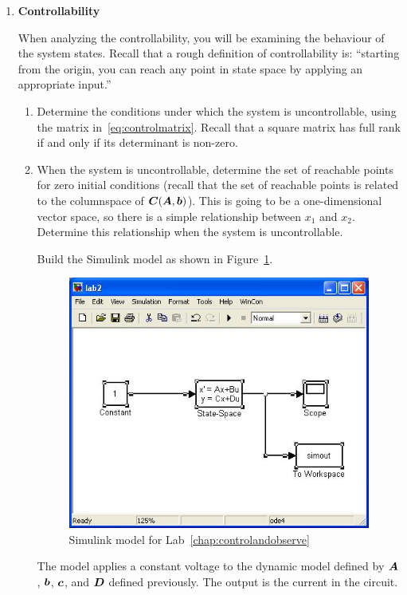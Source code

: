 \begin{enumerate}
    \item \textbf{Controllability}\label{step:1}

          When analyzing the controllability, you will be examining the behaviour of
          the system states.  Recall that a rough definition of controllability is:
          ``starting from the origin, you can reach any point in state space by
          applying an appropriate input.''
          \begin{enumerate}
              \item Determine the conditions under which the system is uncontrollable, using the matrix in~\eqref{eq:controlmatrix}.
                    Recall that a square matrix has full rank if and only if its determinant is
                    non-zero.
              \item When the system is uncontrollable, determine the set of reachable
                    points for zero initial conditions (recall that the set of reachable points is related to the columnspace of \( \boldsymbol{C}(\boldsymbol{A},\boldsymbol{b}) \)). This is going to be a one-dimensional
                    vector space, so there is a simple relationship between \(x_{1}\) and \(x_{2}\).
                    Determine this relationship when the system is uncontrollable.

                    \vspace{0.5em}
                    Build the \textsf{Simulink} model as shown in
                    Figure~\ref{fig:model2}.
                    \begin{figure}[htbp]
                        \centering
                        \includegraphics[width=0.6\hsize]{pix/controlandobservemodel.jpg}
                        \caption{\textsf{Simulink} model for Lab~\ref{chap:controlandobserve}}\label{fig:model2}
                    \end{figure}%
                    The model applies a constant voltage to the dynamic model defined by
                    \(\boldsymbol{A}\), \(\boldsymbol{b}\), \(\boldsymbol{c}\), and \(\boldsymbol{D}\) defined
                    previously. The output is the current in the circuit.


\end{enumerate}
\end{enumerate}
